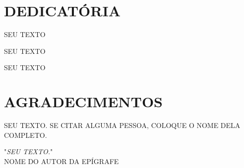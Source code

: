 \documentclass[brazil]{abnt-UVV/abnt-uvv}
\begin{document}
\chapter*{DEDICATÓRIA}
 \vspace*{15cm}
 \begin{flushright}
 {\large {\em {SEU TEXTO \par SEU TEXTO \par SEU TEXTO}}}
\end{flushright}
\pagebreak


\chapter*{AGRADECIMENTOS}

SEU TEXTO. SE CITAR ALGUMA PESSOA, COLOQUE O NOME DELA COMPLETO.

\pagebreak

\vspace*{15cm}
\begin{flushright}{}"\emph{SEU TEXTO.}"\\
{\small NOME DO AUTOR DA EPÍGRAFE}\end{flushright}{\small \par}
\vfill{}
\pagebreak

\listadetabelas

\listadefiguras
\end{document}
